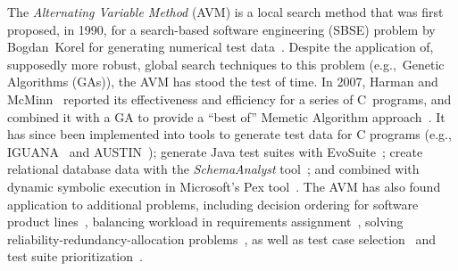 \documentclass{llncs}
\newcommand{\AVM}{Alternating Variable Method\xspace}
\begin{document}

\begin{sloppypar}
The {\it \AVM\/} (AVM) is a local search method that was first proposed, in 1990, for a search-based software engineering (SBSE) problem
by \mbox{Bogdan Korel}
for generating \mbox{numerical}
test data~\cite{Korel1990}.
Despite the \mbox{application} of, supposedly more robust, global search techniques to this \mbox{problem} (e.g.,~\mbox{Genetic} Algorithms (GAs)),
the AVM has stood the test of time. In 2007, Harman and McMinn~\cite{Harman2007} reported its effectiveness and
efficiency for a series of C~\mbox{programs}, and combined it with a GA to provide a ``best of'' Memetic \mbox{Algorithm}
\mbox{approach}~\cite{Harman2010}. It has since been implemented into tools to generate test data for C programs (e.g.,
IGUANA~\cite{McMinn2007} and AUSTIN~\cite{Lakhotia2010,Lakhotia2013});
generate Java test suites
with {\sc
EvoSuite}~\cite{Fraser2013,Fraser2015b}; create relational database data with the {\it SchemaAnalyst\/} tool~\cite{Kapfhammer2013,McMinn2015}; and combined with dynamic symbolic execution in Microsoft's Pex tool~\cite{Lakhotia2010b}.
The AVM has also found application to
additional problems, including
%
decision ordering for %
software product lines~\cite{Yue2016}, %
%
balancing workload in requirements assignment~\cite{Yue2014}, %
%
solving reliability-redundancy-allocation problems~\cite{Qiu2016}, %
%
as well as test case selection~\cite{Pradhan2016} and test suite prioritization~\cite{Arrieta2016}. %
\end{sloppypar}
\end{document}
